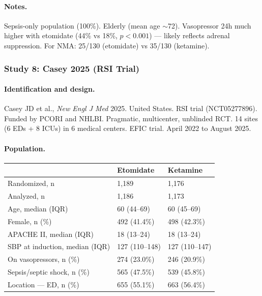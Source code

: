 \documentclass[11pt]{article}
\begin{document}
\paragraph{Notes.}
Sepsis-only population (100\%). Elderly (mean age $\sim$72). Vasopressor 24h much higher with etomidate (44\% vs 18\%, $p < 0.001$) --- likely reflects adrenal suppression. For NMA: 25/130 (etomidate) vs 35/130 (ketamine).

\bigskip

\subsubsection{Study 8: Casey 2025 (RSI Trial)}

\paragraph{Identification and design.}
Casey JD et al., \textit{New Engl J Med} 2025. United States. RSI trial (NCT05277896). Funded by PCORI and NHLBI. Pragmatic, multicenter, unblinded RCT. 14 sites (6 EDs + 8 ICUs) in 6 medical centers. EFIC trial. April 2022 to August 2025.

\paragraph{Population.}

\begin{table}[H]
\centering\footnotesize
\begin{tabularx}{\textwidth}{L{4cm} C{3cm} C{3cm}}
\toprule
& \textbf{Etomidate} & \textbf{Ketamine} \\
\midrule
Randomized, n & 1,189 & 1,176 \\
Analyzed, n & 1,186 & 1,173 \\
Age, median (IQR) & 60 (44--69) & 60 (45--69) \\
Female, n (\%) & 492 (41.4\%) & 498 (42.3\%) \\
APACHE II, median (IQR) & 18 (13--24) & 18 (13--24) \\
SBP at induction, median (IQR) & 127 (110--148) & 127 (110--147) \\
On vasopressors, n (\%) & 274 (23.0\%) & 246 (20.9\%) \\
Sepsis/septic shock, n (\%) & 565 (47.5\%) & 539 (45.8\%) \\
Location --- ED, n (\%) & 655 (55.1\%) & 663 (56.4\%) \\
\bottomrule
\end{tabularx}
\end{table}
\end{document}
